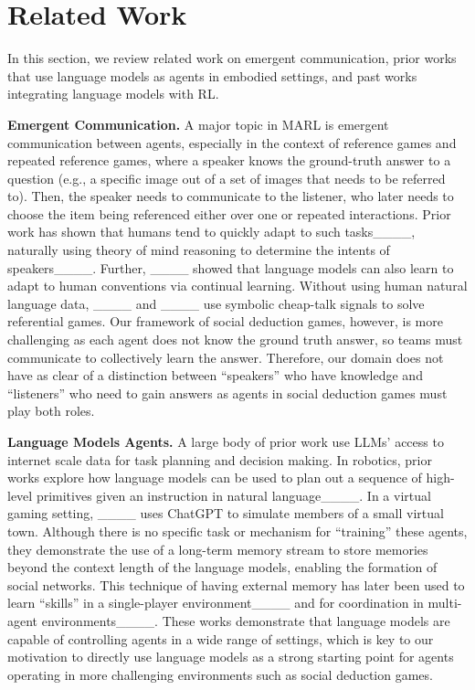 \section{Related Work}
In this section, we review related work on emergent communication, prior works that use language models as agents in embodied settings, and past works integrating language models with RL.

\smallskip

\noindent \textbf{Emergent Communication.} A major topic in MARL is emergent communication between agents, especially in the context of reference games and repeated reference games, where a speaker knows the ground-truth answer to a question (e.g., a specific image out of a set of images that needs to be referred to). Then, the speaker needs to communicate to the listener, who later needs to choose the item being referenced either over one or repeated interactions.
Prior work has shown that humans tend to quickly adapt to such tasks____, naturally using theory of mind reasoning to determine the intents of speakers____. Further, ____ showed that language models can also learn to adapt to human conventions via continual learning. Without using human natural language data, ____ and ____ use symbolic cheap-talk signals to solve referential games. Our framework of social deduction games, however, is more challenging as each agent does not know the ground truth answer, so teams must communicate to collectively learn the answer. Therefore, our domain does not have as clear of a distinction between ``speakers'' who have knowledge and ``listeners'' who need to gain answers as agents in social deduction games must play both roles.

\smallskip

\noindent \textbf{Language Models Agents.} A large body of prior work use LLMs' access to internet scale data for task planning and decision making. In robotics, prior works explore how language models can be used to plan out a sequence of high-level primitives given an instruction in natural language____. %
In a virtual gaming setting, ____ uses ChatGPT to simulate members of a small virtual town. Although there is no specific task or mechanism for ``training'' these agents, they demonstrate the use of a long-term memory stream to store memories beyond the context length of the language models, enabling the formation of social networks. This technique of having external memory has later been used to learn ``skills'' in a single-player environment____ and for coordination in multi-agent environments____.  These works demonstrate that language models are capable of controlling agents in a wide range of settings, which is key to our motivation to directly use language models as a strong starting point for agents operating in more challenging environments such as social deduction games.

